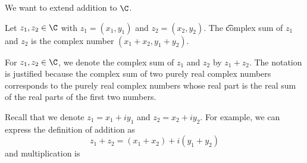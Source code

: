 

We want to extend addition to $\C$.

Let $z_1, z_2 \in \C$ with $z_1 = (x_1, y_1)$ and $z_2 = (x_2, y_2)$.
The \t{complex sum} of $z_1$ and $z_2$ is the complex number $(x_1+x_2,y_1+y_2)$.


For $z_1, z_2 \in \C$, we denote the complex sum of $z_1$ and $z_2$ by $z_1 + z_2$.
The notation is justified because the complex sum of two purely real complex numbers corresponds to the purely real complex numbers whose real part is the real sum of the real parts of the first two numbers.


Recall that we denote $z_1 = x_1 + iy_1$ and $z_2 = x_2 + iy_2$.
For example, we can express the definition of addition as
\[
	z_1 + z_2 = (x_1 + x_2) + i(y_1 + y_2)
\]
and multiplication is

\blankpage
